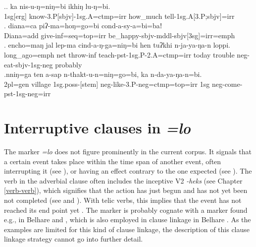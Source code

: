 \ex.\ag. ka nis-u-ŋ=niŋ=bi ikhiŋ lu-ŋ=bi.\\
	{\sc 1sg[erg]} 	know{\sc -3.P[sbjv]-1sg.A=ctmp=irr} how\_much tell{\sc -1sg.A[3.P;sbjv]=irr}\\
	 \bg. diana=ca  piʔ-ma=hoŋ=go=bi   cond-a-sy-a=bi=baǃ\\
	Diana{\sc =add} give{\sc -inf=seq=top=irr} be\_happy{\sc -sbjv-mddl-sbjv[3sg]=irr=emph}\\
	 
	\bg. encho=maŋ     jal lep-ma   cind-a-ŋ-ga=niŋ=bi     hen   tuʔkhi n-ja-ya-ŋa-n    loppi.\\
	long\_ago{\sc =emph} net throw{\sc -inf} teach{\sc -pst-1sg.P-2.A=ctmp=irr} today trouble {\sc neg-}eat{\sc -sbjv-1sg-neg} probably\\
	 
	\bg.nniŋ=ga ten a-sap n-thakt-u-n=niŋ=go=bi, ka n-da-ya-ŋa-n=bi.\\
	{\sc 2pl=gen} village {\sc 1sg.poss-[stem]} {\sc neg-}like{\sc -3.P-neg=ctmp=top=irr} {\sc 1sg} {\sc neg-}come{\sc -pst-1sg-neg=irr}\\

 

\section{Interruptive clauses in \emph{=lo}}\label{adv-cl-int}

The  marker \emph{=lo} does not figure prominently in the current corpus. It signals that a certain event takes place within the time span of another event, often interrupting it (see \Next[a]), or having an effect  contrary to the one expected (see \Next[b]). The verb in the adverbial clause often includes the inceptive V2 \emph{-heks} (see Chapter \ref{verb-verb}), which signifies that the action has just begun and has not yet been not completed (see \Next[a] and \Next[b]). With telic verbs, this implies that the event has not reached its end point yet \Next[c]. The marker is probably cognate with a  marker found e.g., in Belhare and , which is also employed in clause linkage in Belhare \citep{Bickel1993Belhare, Doornenbal2009A-grammar}. As the examples are limited for this kind of clause linkage, the description of this clause linkage strategy cannot go into further detail.

